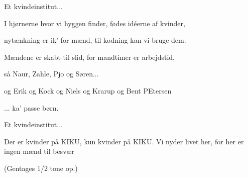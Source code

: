 \documentclass[a4paper,11pt]{article}
\begin{document}
\begin{song}
 Et kvindeinstitut...

I hjørnerne hvor vi hyggen finder, fødes idéerne af kvinder,

nytænkning er ik' for mænd, til kodning kan vi bruge dem.

Mændene er skabt til slid, for mandtimer er arbejdstid,

så Naur, Zahle, Pjo og Søren...

 og Erik og Kock og Niels og Krarup og Bent PEtersen

... ka' passe børn.

 Et kvindeinstitut...

 Der er kvinder på KIKU,
kun kvinder på KIKU.
Vi nyder livet her,
for her er ingen mænd til besvær

(Gentages 1/2 tone op.)

\end{song}
\end{document}
